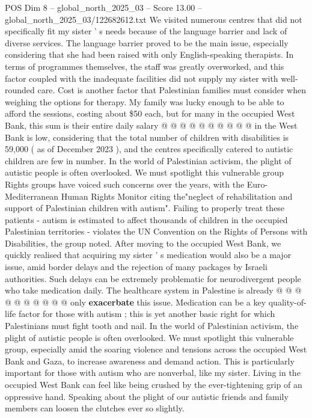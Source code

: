 \begin{textsample}{POS Dim 8 – global\_north\_2025\_03 – Score 13.00 – global\_north\_2025\_03/122682612.txt}
We visited numerous centres that did not specifically fit my sister ' s needs because of the language barrier and lack of diverse services.
The language barrier proved to be the main issue, especially considering that she had been raised with only English-speaking therapists.
In terms of programmes themselves, the staff was greatly overworked, and this factor coupled with the inadequate facilities did not supply my sister with well-rounded care.
Cost is another factor that Palestinian families must consider when weighing the options for therapy.
My family was lucky enough to be able to afford the sessions, costing about \$50 each, but for many in the occupied West Bank, this sum is their entire daily salary @ @ @ @ @ @ @ @ @ @ in the West Bank is low, considering that the total number of children with disabilities is 59,000 ( as of December 2023 ), and the centres specifically catered to autistic children are few in number.
In the world of Palestinian activism, the plight of autistic people is often overlooked.
We must spotlight this vulnerable group Rights groups have voiced such concerns over the years, with the Euro-Mediterranean Human Rights Monitor citing the"neglect of rehabilitation and support of Palestinian children with autism".
Failing to properly treat these patients - autism is estimated to affect thousands of children in the occupied Palestinian territories - violates the UN Convention on the Rights of Persons with Disabilities, the group noted.
After moving to the occupied West Bank, we quickly realised that acquiring my sister ' s medication would also be a major issue, amid border delays and the rejection of many packages by Israeli authorities.
Such delays can be extremely problematic for neurodivergent people who take medication daily.
The healthcare system in Palestine is already @ @ @ @ @ @ @ @ @ @ only \textbf{exacerbate} this issue.
Medication can be a key quality-of-life factor for those with autism ; this is yet another basic right for which Palestinians must fight tooth and nail.
In the world of Palestinian activism, the plight of autistic people is often overlooked.
We must spotlight this vulnerable group, especially amid the soaring violence and tensions across the occupied West Bank and Gaza, to increase awareness and demand action.
This is particularly important for those with autism who are nonverbal, like my sister.
Living in the occupied West Bank can feel like being crushed by the ever-tightening grip of an oppressive hand.
Speaking about the plight of our autistic friends and family members can loosen the clutches ever so slightly.

\end{textsample}
